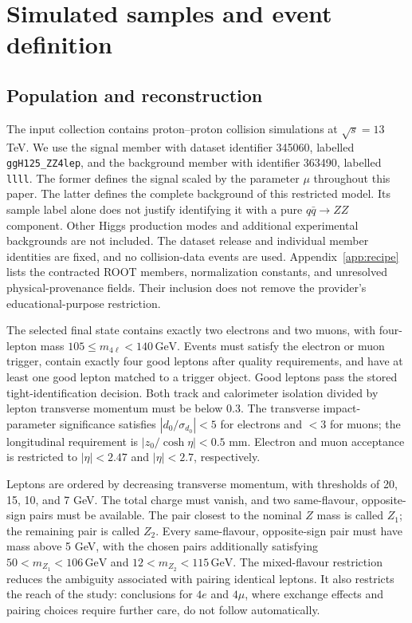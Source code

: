 \documentclass[aps,prd,reprint,superscriptaddress,nofootinbib,longbibliography,floatfix]{revtex4-2}
\let\label\OriginalLaTeXLabel
\newcommand{\mfl}{m_{4\ell}}
\newcommand{\GeV}{\,\mathrm{GeV}}
\begin{document}
\section{Simulated samples and event definition}
\label{sec:samples}

\subsection{Population and reconstruction}

The input collection contains proton--proton collision simulations at
$\sqrt{s}=13$ TeV. We use the signal member with dataset identifier 345060,
labelled \texttt{ggH125\_ZZ4lep}, and the background member with identifier
363490, labelled \texttt{llll}. The former defines the signal scaled by the
parameter $\mu$ throughout this paper. The latter defines the complete
background of this restricted model. Its sample label alone does not justify
identifying it with a pure $q\bar q\to ZZ$ component. Other Higgs production
modes and additional experimental backgrounds are not included. The dataset
release and individual member identities are fixed, and no collision-data
events are used. Appendix~\ref{app:recipe} lists the contracted ROOT members,
normalization constants, and unresolved physical-provenance fields. Their
inclusion does not remove the provider's educational-purpose restriction.

The selected final state contains exactly two electrons and two muons, with
four-lepton mass $105\leq\mfl<140\GeV$. Events must satisfy the electron or
muon trigger, contain exactly four good leptons after quality requirements,
and have at least one good lepton matched to a trigger object. Good leptons
pass the stored tight-identification decision. Both track and calorimeter
isolation divided by lepton transverse momentum must be below 0.3. The
transverse impact-parameter significance satisfies $|d_0/\sigma_{d_0}|<5$
for electrons and $<3$ for muons; the longitudinal requirement is
$|z_0/\cosh\eta|<0.5$ mm. Electron and muon acceptance is restricted to
$|\eta|<2.47$ and $|\eta|<2.7$, respectively.

Leptons are ordered by decreasing transverse momentum, with thresholds of
20, 15, 10, and 7 GeV. The total charge must vanish, and two same-flavour,
opposite-sign pairs must be available. The pair closest to the nominal
$Z$ mass is called $Z_1$; the remaining pair is called $Z_2$. Every
same-flavour, opposite-sign pair must have mass above 5 GeV, with the chosen
pairs additionally satisfying $50<m_{Z_1}<106\GeV$ and
$12<m_{Z_2}<115\GeV$. The mixed-flavour restriction reduces the ambiguity
associated with pairing identical leptons. It also restricts the reach of the
study: conclusions for $4e$ and $4\mu$, where exchange effects and pairing
choices require further care, do not follow automatically.
\end{document}
